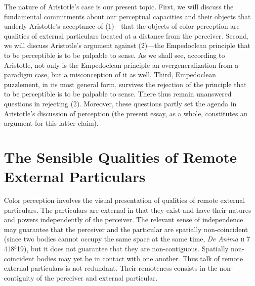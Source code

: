 The nature of Aristotle's case is our present topic. First, we will discuss the fundamental commitments about our perceptual capacities and their objects that underly Aristotle's acceptance of (1)---that the objects of color perception are qualities of external particulars located at a distance from the perceiver. Second, we will discuss Aristotle's argument against (2)---the Empedoclean principle that to be perceptible is to be palpable to sense. As we shall see, according to Aristotle, not only is the Empedoclean principle an overgeneralization from a paradigm case, but a misconception of it as well. Third, Empedoclean puzzlement, in its most general form, survives the rejection of the principle that to be perceptible is to be palpable to sense. There thus remain unanswered questions in rejecting (2). Moreover, these questions partly set the agenda in Aristotle's discussion of perception (the present essay, as a whole, constitutes an argument for this latter claim). 

\section{The Sensible Qualities of Remote External Particulars} %
\label{sec:sensible_qualities_of_remote_external_particulars}

Color perception involves the visual presentation of qualities of remote external particulars. The particulars are external in that they exist and have their natures and powers independently of the perceiver. The relevant sense of independence may guarantee that the perceiver and the particular are spatially non-coincident (since two bodies cannot occupy the same space at the same time, \emph{De Anima} \textsc{ii} 7 418\( ^{b} \)19), but it does not guarantee that they are non-contiguous. Spatially non-coincident bodies may yet be in contact with one another. Thus talk of remote external particulars is not redundant. Their remoteness consists in the non-contiguity of the perceiver and external particular.

